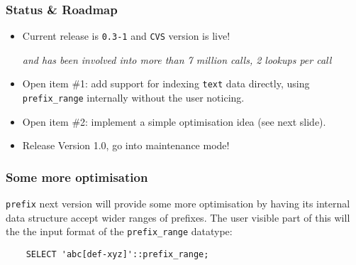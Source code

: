 \documentclass{beamer}
\begin{document}
\begin{frame}[fragile]
  \frametitle{Status \& Roadmap}

  \begin{itemize}

  \item<1-> Current release is \texttt{0.3-1} and \texttt{CVS} version is
    live!

     \textit{and has been involved into more than 7 million calls, 2 lookups per
       call}

   \item<2-> Open item \#1: add support for indexing \texttt{text} data
     directly, using \texttt{prefix\_range} internally without the user
     noticing.

   \item<3-> Open item \#2: implement a simple optimisation idea (see next
     slide).

   \item<4-> Release Version 1.0, go into maintenance mode!

  \end{itemize}
\end{frame}

\begin{frame}[fragile]
  \frametitle{Some more optimisation}
  
  \texttt{prefix} next version will provide some more optimisation by having
  its internal data structure accept wider ranges of prefixes.  The user
  visible part of this will the the input format of the
  \texttt{prefix\_range} datatype:

  \pause

  \begin{example}
  \begin{verbatim}
    SELECT 'abc[def-xyz]'::prefix_range;
  \end{verbatim}
  \end{example}
\end{frame}

\end{document}

